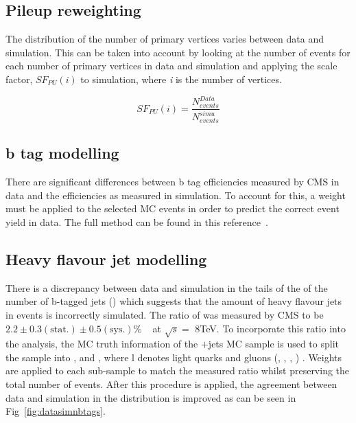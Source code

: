 \subsection{Pileup reweighting}
\label{sec:pile-up}
The distribution of the number of primary vertices varies between data and simulation. This can be taken into account by looking at the number of events for each number of primary vertices in data and simulation and applying the scale factor, $SF_{PU}\left( i \right)$ to simulation, where \emph{i} is the number of vertices.

\begin{equation}
SF_{PU}\left( i \right) = \frac{N_{events}^{Data}}{  N_{events}^{simu}} 
\label{eqn:PUSF}
\end{equation}

\subsection{b tag modelling}

There are significant differences between b tag efficiencies measured by CMS in data and the efficiencies as measured in simulation. To account for this, a weight must be applied to the selected MC events in order to predict the correct event yield in data. The full method can be found in this reference~\cite{CMS-PAS-BTV-13-001}.

\subsection{Heavy flavour jet modelling}

There is a discrepancy between data and simulation in the tails of the  of the number of b-tagged jets (\nbtags) which suggests that the amount of heavy flavour jets in \ttbar events is incorrectly simulated. The ratio of \heavyflavour was measured by CMS to be $2.2 \pm 0.3 \left( \textrm{stat.} \right) \pm 0.5 \left(\textrm{sys.} \right)\% $ ~\cite{CMS:2014yxa} at $\sqrt{s} =$ 8TeV. To incorporate this ratio into the analysis, the MC truth information of the \ttbar$+$jets MC sample is used to split the sample into \ttbb, \ttcc and \ttll, where l denotes light quarks and gluons (\cPqu, \cPqd, \cPqs, \cPg) . Weights are applied to each sub-sample to match the measured ratio whilst preserving the total number of \ttbar events. After this procedure is applied, the agreement between data and simulation in the \nbtags distribution is improved as can be seen in Fig~\ref{fig:datasimnbtags}.

